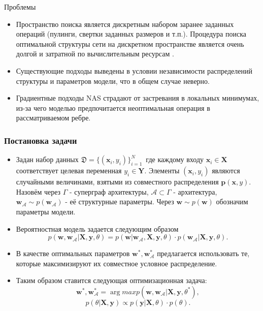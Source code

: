 \documentclass[9pt]{beamer}
\begin{document}
	\begin{frame}{Проблемы}
		\begin{itemize}
			\item Пространство поиска является дискретным набором заранее заданных операций (пулинги, свертки заданных размеров и т.п.). Процедура поиска оптимальной структуры сети на дискретном пространстве является очень долгой и затратной по вычислительным ресурсам \cite{DBLP:journals/corr/ZophVSL17}. 
			\item Существующие подходы выведены в условии независимости распределений структуры и параметров модели, что в общем случае неверно.
			\item Градиентные подходы NAS страдают от застревания в локальных минимумах, из-за чего моделью предпочитается неоптимальная операция в рассматриваемом ребре.
		\end{itemize}
		
	\end{frame}
	
	\begin{frame}
		\frametitle{Постановка задачи}
		\begin{itemize}
			\item Задан набор данных $\mathfrak{D} = \{(\mathbf{x}_i, y_i)\}_{i=1}^{N}$\, где каждому входу $\mathbf{x}_i\in \mathbf{X}$ соответствует целевая переменная $y_i\in \mathbf{Y}$. Элементы $(\mathbf{x}_i, y_i)$ являются случайными величинами, взятыми из совместного распределения $\mathbf{p}(\mathbf{x}, y)$. Назовём через $\Gamma$ - суперграф архитектуры, $\mathcal{A}\subset \Gamma$ - архитектура,  $\mathbf{w_{\mathcal{A}}} \sim p(\mathbf{w_{\mathcal{A}}})$ - её структурные параметры. Через $\mathbf{w} \sim p(\mathbf{w})$ обозначим параметры модели.
			\item Вероятностная модель задается следующим образом
			$$p(\mathbf{w}, \mathbf{w_{\mathcal{A}}}|\mathbf{X}, \mathbf{y}, \theta) = p(\mathbf{w}|\mathbf{w_{\mathcal{A}}}, \mathbf{X}, \mathbf{y}, \theta)\cdot p(\mathbf{w_{\mathcal{A}}}|\mathbf{X}, \mathbf{y}, \theta).$$
			\item В качестве оптимальных параметров $\mathbf{w}^{*}, \mathbf{w^{*}_{\mathcal{A}}}$ предлагается использовать те, которые максимизируют их совместное условное распределение.
			\item Таким образом ставится следующая оптимизационная задача:
			$$\mathbf{w}^{*}, \mathbf{w^{*}_{\mathcal{A}}} = \arg max p(\mathbf{w}, \mathbf{w_{\mathcal{A}}}|\mathbf{X}, \mathbf{y}, \theta^{*}),$$
			$$p(\theta|\mathbf{X}, \mathbf{y})\propto p(\mathbf{y}|\mathbf{X}, \theta)\cdot p(\theta).$$
		\end{itemize}
		
	\end{frame}
	
\end{document}
